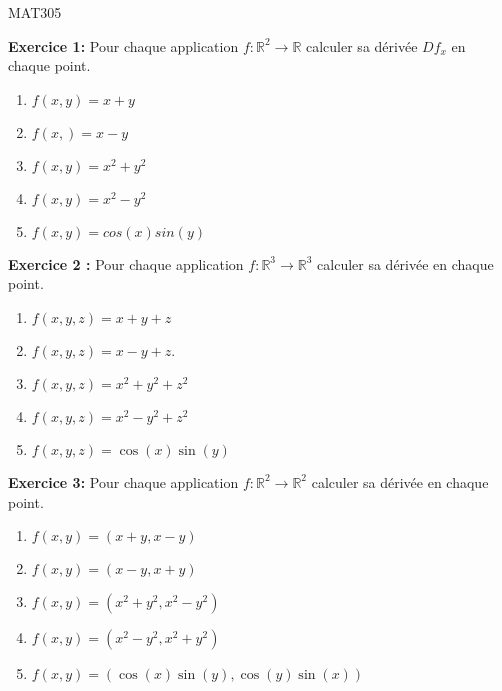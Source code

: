 \documentclass{article}
\begin{document}
\begin{center}
	{\Large MAT305 }
\end{center}

\hline
\vspace{.5in}

\textbf{Exercice 1:} Pour chaque application $f:\mathbb{R}^2
\rightarrow \mathbb{R}$ calculer sa dérivée $Df_x$ en chaque point.
\begin{enumerate}
	\item $f(x,y) = x+y$
	\item $f(x,) =  x-y$
	\item $f(x,y) = x^2+y^2$
	\item  $f(x,y) = x^2-y^2$
	\item $f(x,y) = cos(x)sin(y)$
\end{enumerate}

\hline
\vspace{.5in}


\textbf{Exercice 2 :} 
Pour chaque application $f:\mathbb{R}^3 \rightarrow \mathbb{R}^3$
calculer sa dérivée en chaque point.

\begin{enumerate}
	\item $f(x,y,z) = x+y+z$
	\item  $f(x,y,z) =  x-y+z.$
	\item $f(x,y,z) = x^2+y^2+z^2$
	\item $f(x,y,z) = x^2-y^2+z^2$
	\item $f(x,y,z) = \cos(x)\sin(y)$

\end{enumerate}

\vspace{1cm}
\hline
\vspace{.5in}

\textbf{Exercice 3:} Pour chaque application $f:\mathbb{R}^2
\rightarrow \mathbb{R}^2$
calculer sa dérivée en chaque point.
\begin{enumerate}
	\item $f(x,y) = (x+y, x-y)$
	\item $f(x,y) = (x-y, x+y)$
	\item $f(x,y) = (x^2+y^2, x^2-y^2)$
	\item $f(x,y) = (x^2-y^2, x^2+y^2)$
	\item $f(x,y) = (\cos(x)\sin(y), \cos(y)\sin(x))$
\end{enumerate}
\vspace{1in}
\end{document}
